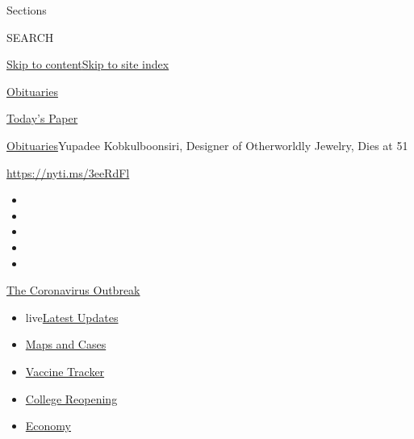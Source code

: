 Sections

SEARCH

\protect\hyperlink{site-content}{Skip to
content}\protect\hyperlink{site-index}{Skip to site index}

\href{https://www.nytimes3xbfgragh.onion/section/obituaries}{Obituaries}

\href{https://myaccount.nytimes3xbfgragh.onion/auth/login?response_type=cookie\&client_id=vi}{}

\href{https://www.nytimes3xbfgragh.onion/section/todayspaper}{Today's
Paper}

\href{/section/obituaries}{Obituaries}\textbar{}Yupadee Kobkulboonsiri,
Designer of Otherworldly Jewelry, Dies at 51

\url{https://nyti.ms/3eeRdFl}

\begin{itemize}
\item
\item
\item
\item
\item
\end{itemize}

\href{https://www.nytimes3xbfgragh.onion/news-event/coronavirus?action=click\&pgtype=Article\&state=default\&region=TOP_BANNER\&context=storylines_menu}{The
Coronavirus Outbreak}

\begin{itemize}
\tightlist
\item
  live\href{https://www.nytimes3xbfgragh.onion/2020/08/03/world/coronavirus-covid-19.html?action=click\&pgtype=Article\&state=default\&region=TOP_BANNER\&context=storylines_menu}{Latest
  Updates}
\item
  \href{https://www.nytimes3xbfgragh.onion/interactive/2020/us/coronavirus-us-cases.html?action=click\&pgtype=Article\&state=default\&region=TOP_BANNER\&context=storylines_menu}{Maps
  and Cases}
\item
  \href{https://www.nytimes3xbfgragh.onion/interactive/2020/science/coronavirus-vaccine-tracker.html?action=click\&pgtype=Article\&state=default\&region=TOP_BANNER\&context=storylines_menu}{Vaccine
  Tracker}
\item
  \href{https://www.nytimes3xbfgragh.onion/2020/08/02/us/covid-college-reopening.html?action=click\&pgtype=Article\&state=default\&region=TOP_BANNER\&context=storylines_menu}{College
  Reopening}
\item
  \href{https://www.nytimes3xbfgragh.onion/live/2020/08/03/business/stock-market-today-coronavirus?action=click\&pgtype=Article\&state=default\&region=TOP_BANNER\&context=storylines_menu}{Economy}
\end{itemize}

